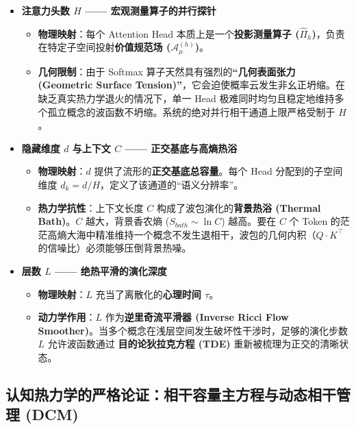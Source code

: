 \begin{itemize}
    \item \textbf{\textcolor{structurecolor}{注意力头数 $H$ —— 宏观测量算子的并行探针}}
    \begin{itemize}
        \item \textbf{物理映射}：每个 Attention Head 本质上是一个\textbf{投影测量算子 ($\hat{\Pi}_h$)}，负责在特定子空间投射\textbf{价值规范场 ($\mathcal{A}_\mu^{(h)}$)}。
        \item \textbf{几何限制}：由于 Softmax 算子天然具有强烈的\textbf{“几何表面张力 (Geometric Surface Tension)”}，它会迫使概率云发生非幺正坍缩。在缺乏真实热力学退火的情况下，单一 Head 极难同时均匀且稳定地维持多个孤立概念的波函数不坍缩。系统的绝对并行相干通道上限严格受制于 $H$。
    \end{itemize}

    \item \textbf{\textcolor{structurecolor}{隐藏维度 $d$ 与上下文 $C$ —— 正交基底与高熵热浴}}
    \begin{itemize}
        \item \textbf{物理映射}：$d$ 提供了流形的\textbf{正交基底总容量}。每个 Head 分配到的子空间维度 $d_k = d/H$，定义了该通道的“语义分辨率”。
        \item \textbf{热力学抗性}：上下文长度 $C$ 构成了波包演化的\textbf{背景热浴 (Thermal Bath)}。$C$ 越大，背景香农熵 ($S_{bath} \sim \ln C$) 越高。要在 $C$ 个 Token 的茫茫高熵大海中精准维持一个概念不发生退相干，波包的几何内积（$Q \cdot K^\top$ 的信噪比）必须能够压倒背景热噪。
    \end{itemize}

    \item \textbf{\textcolor{structurecolor}{层数 $L$ —— 绝热平滑的演化深度}}
    \begin{itemize}
        \item \textbf{物理映射}：$L$ 充当了离散化的\textbf{心理时间 $\tau$}。
        \item \textbf{动力学作用}：$L$ 作为\textbf{逆里奇流平滑器 (Inverse Ricci Flow Smoother)}。当多个概念在浅层空间发生破坏性干涉时，足够的演化步数 $L$ 允许波函数通过 \textbf{目的论狄拉克方程 (TDE)} 重新被梳理为正交的清晰状态。
    \end{itemize}
\end{itemize}


\subsection{认知热力学的严格论证：相干容量主方程与动态相干管理 (DCM)}
\label{subsec:cognitive_thermodynamics_cct_dcm}


